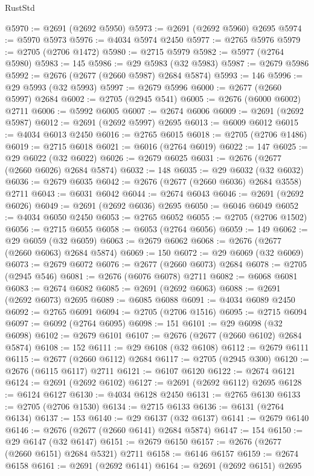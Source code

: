 \begin{lexlean}{RustStd}
\begin{coremodule}
@5970 := @2691 (@2692 @5950)
@5973 := @2691 (@2692 @5960) @2695
@5974 := @5970 @5973
@5976 := @4034 @5974 @2450
@5977 := @2765 @5976
@5979 := @2705 (@2706 @1472)
@5980 := @2715 @5979
@5982 := @5977 (@2764 @5980)
@5983 := 145
@5986 := @29 @5983 (@32 @5983)
@5987 := @2679 @5986
@5992 := @2676 (@2677 (@2660 @5987) @2684 @5874)
@5993 := 146
@5996 := @29 @5993 (@32 @5993)
@5997 := @2679 @5996
@6000 := @2677 (@2660 @5997) @2684
@6002 := @2705 (@2945 @541)
@6005 := @2676 (@6000 @6002) @2711
@6006 := @5992 @6005
@6007 := @2674 @6006
@6009 := @2691 (@2692 @5987)
@6012 := @2691 (@2692 @5997) @2695
@6013 := @6009 @6012
@6015 := @4034 @6013 @2450
@6016 := @2765 @6015
@6018 := @2705 (@2706 @1486)
@6019 := @2715 @6018
@6021 := @6016 (@2764 @6019)
@6022 := 147
@6025 := @29 @6022 (@32 @6022)
@6026 := @2679 @6025
@6031 := @2676 (@2677 (@2660 @6026) @2684 @5874)
@6032 := 148
@6035 := @29 @6032 (@32 @6032)
@6036 := @2679 @6035
@6042 := @2676 (@2677 (@2660 @6036) @2684 @3558) @2711
@6043 := @6031 @6042
@6044 := @2674 @6043
@6046 := @2691 (@2692 @6026)
@6049 := @2691 (@2692 @6036) @2695
@6050 := @6046 @6049
@6052 := @4034 @6050 @2450
@6053 := @2765 @6052
@6055 := @2705 (@2706 @1502)
@6056 := @2715 @6055
@6058 := @6053 (@2764 @6056)
@6059 := 149
@6062 := @29 @6059 (@32 @6059)
@6063 := @2679 @6062
@6068 := @2676 (@2677 (@2660 @6063) @2684 @5874)
@6069 := 150
@6072 := @29 @6069 (@32 @6069)
@6073 := @2679 @6072
@6076 := @2677 (@2660 @6073) @2684
@6078 := @2705 (@2945 @546)
@6081 := @2676 (@6076 @6078) @2711
@6082 := @6068 @6081
@6083 := @2674 @6082
@6085 := @2691 (@2692 @6063)
@6088 := @2691 (@2692 @6073) @2695
@6089 := @6085 @6088
@6091 := @4034 @6089 @2450
@6092 := @2765 @6091
@6094 := @2705 (@2706 @1516)
@6095 := @2715 @6094
@6097 := @6092 (@2764 @6095)
@6098 := 151
@6101 := @29 @6098 (@32 @6098)
@6102 := @2679 @6101
@6107 := @2676 (@2677 (@2660 @6102) @2684 @5874)
@6108 := 152
@6111 := @29 @6108 (@32 @6108)
@6112 := @2679 @6111
@6115 := @2677 (@2660 @6112) @2684
@6117 := @2705 (@2945 @300)
@6120 := @2676 (@6115 @6117) @2711
@6121 := @6107 @6120
@6122 := @2674 @6121
@6124 := @2691 (@2692 @6102)
@6127 := @2691 (@2692 @6112) @2695
@6128 := @6124 @6127
@6130 := @4034 @6128 @2450
@6131 := @2765 @6130
@6133 := @2705 (@2706 @1530)
@6134 := @2715 @6133
@6136 := @6131 (@2764 @6134)
@6137 := 153
@6140 := @29 @6137 (@32 @6137)
@6141 := @2679 @6140
@6146 := @2676 (@2677 (@2660 @6141) @2684 @5874)
@6147 := 154
@6150 := @29 @6147 (@32 @6147)
@6151 := @2679 @6150
@6157 := @2676 (@2677 (@2660 @6151) @2684 @5321) @2711
@6158 := @6146 @6157
@6159 := @2674 @6158
@6161 := @2691 (@2692 @6141)
@6164 := @2691 (@2692 @6151) @2695

\end{coremodule}
\end{lexlean}
